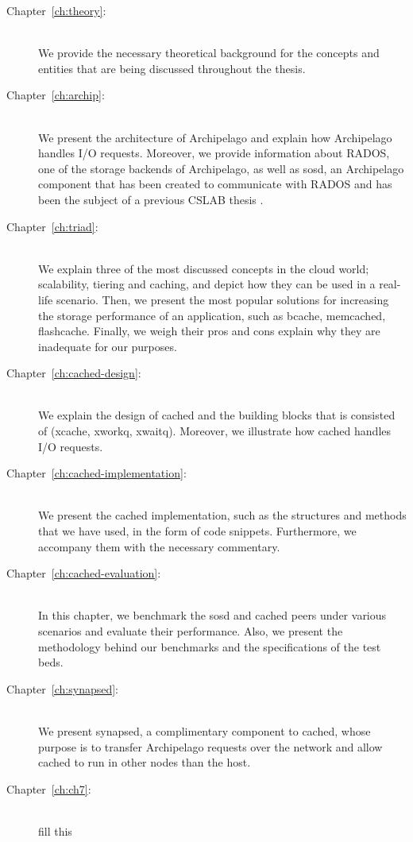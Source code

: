 \begin{description}
\item[Chapter~\ref{ch:theory}:] \hfill \\
	We provide the necessary theoretical background for the concepts and 
	entities that are being discussed throughout the thesis.
\item[Chapter~\ref{ch:archip}:] \hfill \\
	We present the architecture of Archipelago and explain how Archipelago 
	handles I/O requests. Moreover, we provide information about RADOS, one 
	of the storage backends of Archipelago, as well as sosd, an Archipelago 
	component that has been created to communicate with RADOS and has been the 
	subject of a previous CSLAB thesis \cite{sosd}.
\item[Chapter~\ref{ch:triad}:] \hfill \\
	We explain three of the most discussed concepts in the cloud world; 
	scalability, tiering and caching, and depict how they can be used in a 
	real-life scenario. Then, we present the most popular solutions for 
	increasing the storage performance of an application, such as bcache, 
	memcached, flashcache. Finally, we weigh their pros and cons explain 
	why they are inadequate for our purposes.
\item[Chapter~\ref{ch:cached-design}:] \hfill \\
	We explain the design of cached and the building blocks that is 
	consisted of (xcache, xworkq, xwaitq). Moreover, we illustrate how 
	cached handles I/O requests.
\item[Chapter~\ref{ch:cached-implementation}:] \hfill \\
	We present the cached implementation, such as the structures and 
	methods that we have used, in the form of code snippets. Furthermore, 
	we accompany them with the necessary commentary.
\item[Chapter~\ref{ch:cached-evaluation}:] \hfill \\
	In this chapter, we benchmark the sosd and cached peers under various 
	scenarios and evaluate their performance. Also, we present the 
	methodology behind our benchmarks and the specifications of the test 
	beds.
\item[Chapter~\ref{ch:synapsed}:] \hfill \\
	We present synapsed, a complimentary component to cached, whose purpose 
	is to transfer Archipelago requests over the network and allow cached 
	to run in other nodes than the host.
\item[Chapter~\ref{ch:ch7}:] \hfill \\
	\todo fill this
\end{description}
